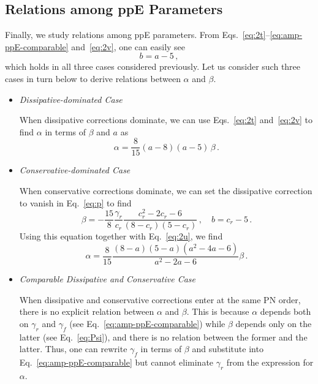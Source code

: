 \documentclass[prd,twocolumn,nofootinbib]{revtex4-1}
\begin{document}
\subsection{Relations among ppE Parameters}

Finally, we study relations among ppE parameters. From Eqs.~\eqref{eq:2t}--\eqref{eq:amp-ppE-comparable} and~\eqref{eq:2v}, one can easily see 
\begin{equation}
b=a-5\,,
\end{equation}
which holds in all three cases considered previously. Let us consider such three cases in turn below to derive relations between $\alpha$ and $\beta$. 

\begin{itemize}

\item
\emph{Dissipative-dominated Case}

When dissipative corrections dominate, we can use Eqs.~\eqref{eq:2t} and~\eqref{eq:2v} to find $\alpha$ in terms of $\beta$ and $a$ as
\begin{equation}\label{eq:2w2}
\alpha = \frac{8}{15} (a-8)(a-5) \, \beta\,.
\end{equation}


\item
\emph{Conservative-dominated Case}

When conservative corrections dominate, we can set the dissipative correction to vanish in Eq.~\eqref{eq:p} to find 
\begin{equation}\label{eq:2w}
\beta=-\frac{15}{8}\frac{\gamma_r}{c_r}\frac{c_r^2-2c_r-6}{(8-c_r)(5-c_r)}\,, \quad b=c_r-5\,.
\end{equation}
Using this equation together with Eq.~\eqref{eq:2u}, we find
\begin{equation}
\alpha =\frac{8}{15} \frac{(8-a)(5-a)(a^2-4a-6)}{a^2-2a-6} \beta\,.
\end{equation}


\item
\emph{Comparable Dissipative and Conservative Case}

When dissipative and conservative corrections enter at the same PN order, there is no explicit relation between $\alpha$ and $\beta$. This is because $\alpha$ depends both on $\gamma_r$ and $\gamma_{\dot f}$ (see Eq.~\eqref{eq:amp-ppE-comparable}) while $\beta$ depends only on the latter (see Eq.~\eqref{eq:Psi}), and there is no relation between the former and the latter. Thus, one can rewrite $\gamma_{\dot f}$ in terms of $\beta$ and substitute into Eq.~\eqref{eq:amp-ppE-comparable} but cannot eliminate $\gamma_r$ from the expression for $\alpha$. 

\end{itemize}
\end{document}

